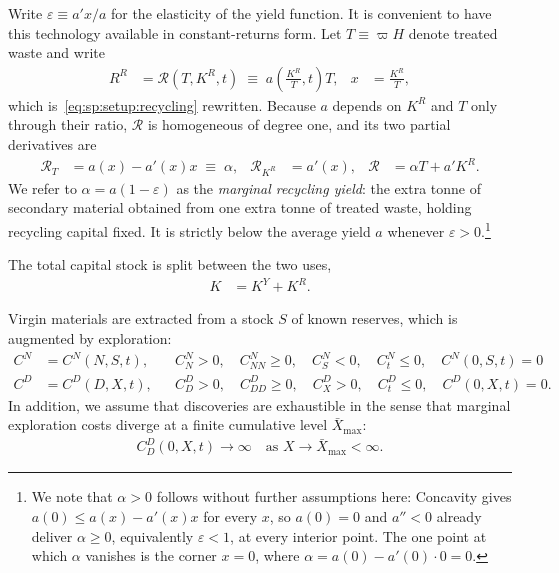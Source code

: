 Write $\varepsilon\equiv a'x/a$ for the elasticity of the yield function. It is convenient to have this technology available in constant-returns form. Let $T\equiv\varpi H$ denote treated waste and write
\begin{align}
R^R &= \mathcal R\left(T,K^R,t\right)\;\equiv\;a\!\left(\frac{K^R}{T},t\right)T,
&
x&=\frac{K^R}{T},
\label{eq:sp:setup:recycling-crs}
\end{align}
which is~\eqref{eq:sp:setup:recycling} rewritten. Because $a$ depends on $K^R$ and $T$ only through
their ratio, $\mathcal R$ is homogeneous of degree one, and its two partial derivatives are
\begin{align}
\mathcal R_T &= a\left(x\right)-a'\!\left(x\right)x \;\equiv\;\alpha,
&
\mathcal R_{K^R} &= a'\!\left(x\right),
&
\mathcal R &= \alpha T+a'K^R .
\label{eq:sp:setup:recycling-derivatives}
\end{align}
We refer to $\alpha=a\left(1-\varepsilon\right)$ as the \emph{marginal recycling yield}: the extra
tonne of secondary material obtained from one extra tonne of treated waste, holding recycling
capital fixed. It is strictly below the average yield $a$ whenever $\varepsilon>0$.\footnote{We note that $\alpha>0$ follows without further assumptions here: Concavity gives
$a\left(0\right)\le a\left(x\right)-a'\left(x\right)x$ for every $x$, so $a(0)=0$ and $a''<0$
already deliver $\alpha\geq 0$, equivalently $\varepsilon<1$, at every interior point. The one point at which $\alpha$
vanishes is the corner $x=0$, where $\alpha=a(0)-a'\!\left(0\right)\cdot 0=0$.}

 The total capital stock is split between the two uses,
\begin{align}
K &= K^Y + K^R.
\label{eq:sp:setup:capital-allocation}
\end{align}

 Virgin materials are extracted from a stock $S$ of known reserves, which is augmented by exploration:
\begin{align}
C^N &= C^N(N,S,t),
&&
C^N_N>0,\quad C^N_{NN}\ge 0,\quad C^N_S<0, \quad C_t^N \leq 0, \quad C^N(0,S,t)=0
\label{eq:sp:setup:extraction-cost}
\\
C^D &= C^D(D,X, t),
&&
C^D_D>0,\quad C^D_{DD}\ge 0,\quad C^D_X>0, \quad C_t^D\leq 0, \quad C^D(0,X,t) =0.
\label{eq:sp:setup:discovery-cost}
\end{align}
In addition, we assume that discoveries are exhaustible in the sense that marginal exploration costs diverge at a finite cumulative level $\bar{X}_{\max}$: 
\begin{align}
    C^D_D(0,X,t)\rightarrow \infty \quad \text{as }X\rightarrow \bar{X}_{\max}<\infty. \label{eq:sp:setup:exhaustible-discovery}
\end{align}



